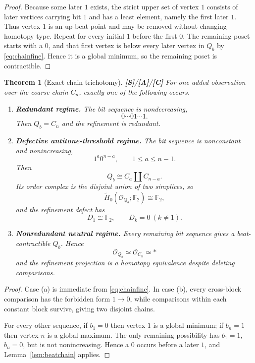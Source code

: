\documentclass[11pt]{article}
\newtheorem{theorem}{Theorem}[section]
\theoremstyle{definition}
\newcommand{\F}{\mathbb F_2}
\newcommand{\OX}{\mathcal O}
\newcommand{\statusS}{\textbf{[S]}}
\newcommand{\statusA}{\textbf{[A]}}
\newcommand{\statusC}{\textbf{[C]}}
\begin{document}
\begin{proof}
Because some later $1$ exists, the strict upper set of vertex $1$ consists of later vertices carrying bit $1$ and has a least element, namely the first later $1$. Thus vertex $1$ is an up-beat point and may be removed without changing homotopy type. Repeat for every initial $1$ before the first $0$. The remaining poset starts with a $0$, and that first vertex is below every later vertex in $Q_b$ by \eqref{eq:chainfine}. Hence it is a global minimum, so the remaining poset is contractible.
\end{proof}

\begin{theorem}[Exact chain trichotomy]\label{thm:chaintrichotomy}
\statusS/\statusA/\statusC\;
For one added observation over the coarse chain $C_n$, exactly one of the following occurs.

\begin{enumerate}[label=\textbf{(\alph*)}]
\item \textbf{Redundant regime.} The bit sequence is nondecreasing,
\[
0\cdots01\cdots1.
\]
Then $Q_b=C_n$ and the refinement is redundant.

\item \textbf{Defective antitone-threshold regime.} The bit sequence is nonconstant and nonincreasing,
\[
1^a0^{n-a},\qquad 1\le a\le n-1.
\]
Then
\[
Q_b\cong C_a\amalg C_{n-a}.
\]
Its order complex is the disjoint union of two simplices, so
\[
\widetilde H_0(\OX_{Q_b};\F)\cong\F,
\]
and the refinement defect has
\[
D_1\cong\F,
\qquad D_k=0\ (k\ne1).
\]

\item \textbf{Nonredundant neutral regime.} Every remaining bit sequence gives a beat-contractible $Q_b$. Hence
\[
\OX_{Q_b}\simeq\OX_{C_n}\simeq *
\]
and the refinement projection is a homotopy equivalence despite deleting comparisons.
\end{enumerate}
\end{theorem}

\begin{proof}
Case (a) is immediate from \eqref{eq:chainfine}. In case (b), every cross-block comparison has the forbidden form $1\to0$, while comparisons within each constant block survive, giving two disjoint chains.

For every other sequence, if $b_1=0$ then vertex $1$ is a global minimum; if $b_n=1$ then vertex $n$ is a global maximum. The only remaining possibility has $b_1=1$, $b_n=0$, but is not nonincreasing. Hence a $0$ occurs before a later $1$, and Lemma~\ref{lem:beatchain} applies.
\end{proof}
\end{document}
